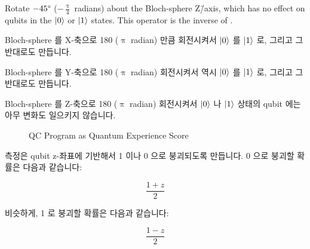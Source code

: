 \begin{description}
	Rotate $-45\degree$ ($-\frac{\uppi}{4}$ radians) about the
	Bloch-sphere Z\=/axis, which has no effect on qubits in the
	$\ket{0}$ or $\ket{1}$ states.
	This operator is the inverse of .
	\fi
\item[\qop{X}\,:]
	Bloch-sphere 를 X-축으로 180\degree{} ($\uppi$ radian) 만큼 회전시켜서
	$\ket{0}$ 를 $\ket{1}$ 로, 그리고 그 반대로도 만듭니다.

\item[\qop{Y}\,:]
	Bloch-sphere 를 Y-축으로 180\degree{} ($\uppi$ radian) 회전시켜서 역시
	$\ket{0}$ 를 $\ket{1}$ 로, 그리고 그 반대로도 만듭니다.

\item[\qop{Z}\,:]
	Bloch-sphere 를 Z-축으로 180\degree{} ($\uppi$ radian) 회전시켜서
	$\ket{0}$ 나 $\ket{1}$ 상태의 qubit 에는 아무 변화도 일으키지 않습니다.

\end{description}

\begin{figure}[tb]
\centering
{}
\caption{QC Program as Quantum Experience Score}
\label{fig:future:QC Program as Quantum Experience Score}
\end{figure}

측정은 qubit z-좌표에 기반해서 1 이나 0 으로 붕괴되도록 만듭니다.
0 으로 붕괴할 확률은 다음과 같습니다:

\begin{equation}
	\frac{1+z}{2}
\end{equation}

비슷하게, 1 로 붕괴할 확률은 다음과 같습니다:

\begin{equation}
	\frac{1-z}{2}
\end{equation}

